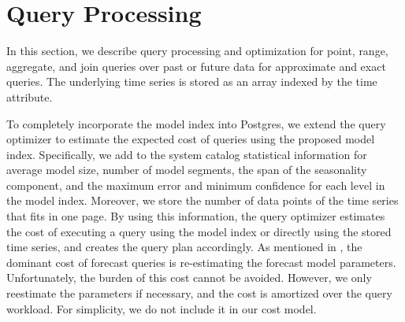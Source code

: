 \documentclass[10pt,conference,letterpaper]{IEEEtran}
\begin{document}

\section{Query Processing}%
\label{sec:online}
In this section, we describe query processing and optimization for point, range, aggregate, and join queries over past or future data for approximate and exact queries.
The underlying time series is stored as an array indexed by the time attribute.

To completely incorporate the model index into Postgres, we extend the query optimizer to estimate the expected cost of queries using the proposed model index.  Specifically, we add to the system catalog statistical information for average model size, number of model segments, the span of the seasonality component, 
and the maximum error and minimum confidence for each level in the model index. Moreover, we store  the number of data points of the time series that fits in one page.
By using this information, the query optimizer estimates the cost of executing a query using the model index or directly using the stored time series,
and creates the query plan accordingly.
As mentioned in \cite{ArimaDB}, the dominant cost of forecast queries is re-estimating the forecast model parameters. Unfortunately, the burden of this cost cannot be avoided. 
However, we only reestimate the parameters if necessary\cite{FRL12}, and the cost is amortized over the query workload. For simplicity, we do not include it in our cost model.
\end{document}

